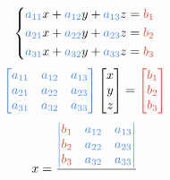 \begin{multicols}{2}
{        
        \begin{equation*}
            \begin{dcases}
                \xmemphB{a_{11}} x + \xmemphB{a_{12}} y + \xmemphB{a_{13}} z = \xmemphR{b_1} \\
                \xmemphB{a_{21}} x + \xmemphB{a_{22}} y + \xmemphB{a_{23}} z = \xmemphR{b_2} \\
                \xmemphB{a_{31}} x + \xmemphB{a_{32}} y + \xmemphB{a_{33}} z = \xmemphR{b_3}
            \end{dcases}
        \end{equation*}
        \begin{equation*}
                \xmemphB{
                    \begin{bmatrix}
                        a_{11} & a_{12} & a_{13} \\
                        a_{21} & a_{22} & a_{23} \\
                        a_{31} & a_{32} & a_{33}
                    \end{bmatrix}
                }
                \begin{bmatrix}
                    x \\
                    y \\
                    z
                \end{bmatrix}
                =
                \xmemphR{
                    \begin{bmatrix}
                        b_1 \\
                        b_2 \\
                        b_3
                    \end{bmatrix}
                }
        \end{equation*}
        \begin{equation*}
                x
                    = \frac{
                        \xmemphB{
                            \begin{vmatrix}
                                \xmemphR{b_1} & a_{12} & a_{13} \\
                                \xmemphR{b_2} & a_{22} & a_{23} \\
                                \xmemphR{b_3} & a_{32} & a_{33}
                            \end{vmatrix}
                        }
                    }{
                        \xmemphB{
}}
\end{equation*}}
\end{multicols}
